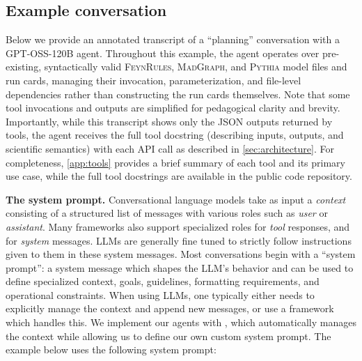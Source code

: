 \documentclass[11pt,oneside]{article}
\numberwithin{equation}{section}
\begin{document}
\subsection{Example conversation}
\label{subsec:example_convo}


Below we provide an annotated transcript of a ``planning'' conversation with a GPT-OSS-120B \cite{openai2025gptoss120bgptoss20bmodel} agent. 
Throughout this example, the agent operates over pre-existing, syntactically valid \textsc{FeynRules}, \textsc{MadGraph}, and \textsc{Pythia} model files and run cards, managing their invocation, parameterization, and file-level dependencies rather than constructing the run cards themselves.
Note that some tool invocations and outputs are simplified for pedagogical clarity and brevity. 
Importantly, while this transcript shows only the JSON outputs returned by tools, the agent receives the full tool docstring (describing inputs, outputs, and scientific semantics) with each API call as described in \cref{sec:architecture}. 
For completeness, \cref{app:tools} provides a brief summary of each tool and its primary use case, while the full tool docstrings are available in the public code repository.

\textbf{The system prompt.}
Conversational language models take as input a \emph{context} consisting of a structured list of messages with various roles such as \emph{user} or \emph{assistant}. 
Many frameworks also support specialized roles for \emph{tool} responses, and for \emph{system} messages. 
LLMs are generally fine tuned to strictly follow instructions given to them in these system messages. 
Most conversations begin with a ``system prompt'': a system message which shapes the LLM's behavior and can be used to define specialized context, goals, guidelines, formatting requirements, and operational constraints.
When using LLMs, one typically either needs to explicitly manage the context and append new messages, or use a framework which handles this. 
We implement our agents with \orchestralai, which automatically manages the context while allowing us to define our own custom system prompt.
The example below uses the following system prompt:
\end{document}
